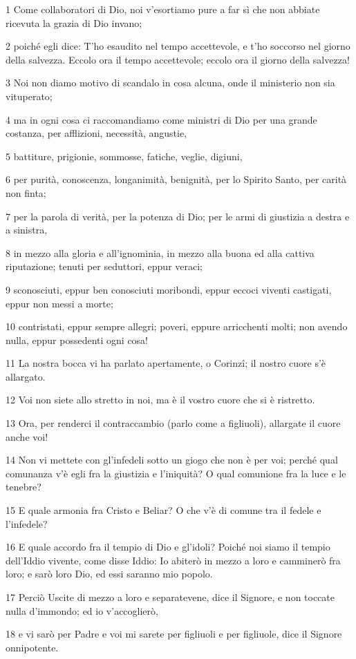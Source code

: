 \par 1 Come collaboratori di Dio, noi v'esortiamo pure a far sì che non abbiate ricevuta la grazia di Dio invano;
\par 2 poiché egli dice: T'ho esaudito nel tempo accettevole, e t'ho soccorso nel giorno della salvezza. Eccolo ora il tempo accettevole; eccolo ora il giorno della salvezza!
\par 3 Noi non diamo motivo di scandalo in cosa alcuna, onde il ministerio non sia vituperato;
\par 4 ma in ogni cosa ci raccomandiamo come ministri di Dio per una grande costanza, per afflizioni, necessità, angustie,
\par 5 battiture, prigionie, sommosse, fatiche, veglie, digiuni,
\par 6 per purità, conoscenza, longanimità, benignità, per lo Spirito Santo, per carità non finta;
\par 7 per la parola di verità, per la potenza di Dio; per le armi di giustizia a destra e a sinistra,
\par 8 in mezzo alla gloria e all'ignominia, in mezzo alla buona ed alla cattiva riputazione; tenuti per seduttori, eppur veraci;
\par 9 sconosciuti, eppur ben conosciuti moribondi, eppur eccoci viventi castigati, eppur non messi a morte;
\par 10 contristati, eppur sempre allegri; poveri, eppure arricchenti molti; non avendo nulla, eppur possedenti ogni cosa!
\par 11 La nostra bocca vi ha parlato apertamente, o Corinzî; il nostro cuore s'è allargato.
\par 12 Voi non siete allo stretto in noi, ma è il vostro cuore che si è ristretto.
\par 13 Ora, per renderci il contraccambio (parlo come a figliuoli), allargate il cuore anche voi!
\par 14 Non vi mettete con gl'infedeli sotto un giogo che non è per voi; perché qual comunanza v'è egli fra la giustizia e l'iniquità? O qual comunione fra la luce e le tenebre?
\par 15 E quale armonia fra Cristo e Beliar? O che v'è di comune tra il fedele e l'infedele?
\par 16 E quale accordo fra il tempio di Dio e gl'idoli? Poiché noi siamo il tempio dell'Iddio vivente, come disse Iddio: Io abiterò in mezzo a loro e camminerò fra loro; e sarò loro Dio, ed essi saranno mio popolo.
\par 17 Perciò Uscite di mezzo a loro e separatevene, dice il Signore, e non toccate nulla d'immondo; ed io v'accoglierò,
\par 18 e vi sarò per Padre e voi mi sarete per figliuoli e per figliuole, dice il Signore onnipotente.

